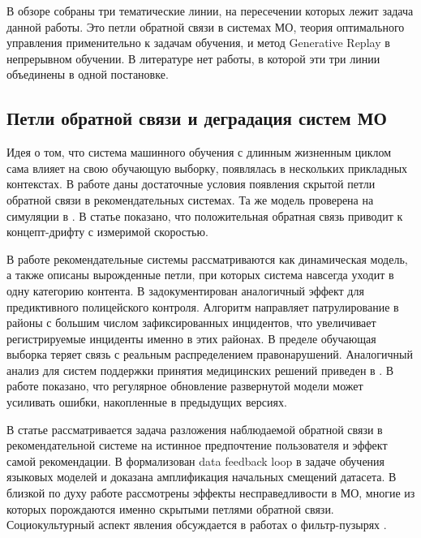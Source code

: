 \documentclass[a4paper,14pt,oneside,openany]{extarticle}
\begin{document}
В обзоре собраны три тематические линии, на пересечении которых лежит задача данной работы. Это петли обратной связи в системах МО, теория оптимального управления применительно к задачам обучения, и метод Generative Replay в непрерывном обучении. В литературе нет работы, в которой эти три линии объединены в одной постановке.

\subsection{Петли обратной связи и деградация систем МО}

Идея о том, что система машинного обучения с длинным жизненным циклом сама влияет на свою обучающую выборку, появлялась в нескольких прикладных контекстах. В работе \cite{khritankov2021existence} даны достаточные условия появления скрытой петли обратной связи в рекомендательных системах. Та же модель проверена на симуляции в \cite{khritankov2021hidden}. В статье \cite{khritankov2023positive} показано, что положительная обратная связь приводит к концепт-дрифту с измеримой скоростью.

В работе \cite{jiang2019degenerate} рекомендательные системы рассматриваются как динамическая модель, а также описаны вырожденные петли, при которых система навсегда уходит в одну категорию контента. В \cite{ensign2018runaway} задокументирован аналогичный эффект для предиктивного полицейского контроля. Алгоритм направляет патрулирование в районы с большим числом зафиксированных инцидентов, что увеличивает регистрируемые инциденты именно в этих районах. В пределе обучающая выборка теряет связь с реальным распределением правонарушений. Аналогичный анализ для систем поддержки принятия медицинских решений приведен в \cite{adam2020hidden}. В работе \cite{adam2022error} показано, что регулярное обновление развернутой модели может усиливать ошибки, накопленные в предыдущих версиях.

В статье \cite{sinha2016deconvolving} рассматривается задача разложения наблюдаемой обратной связи в рекомендательной системе на истинное предпочтение пользователя и эффект самой рекомендации. В \cite{taori2023data} формализован data feedback loop в задаче обучения языковых моделей и доказана амплификация начальных смещений датасета. В близкой по духу работе \cite{chouldechova2020snapshot} рассмотрены эффекты несправедливости в МО, многие из которых порождаются именно скрытыми петлями обратной связи. Социокультурный аспект явления обсуждается в работах о фильтр-пузырях \cite{davies2018redefining, spohr2017fake, michiels2022filter}.
\end{document}
